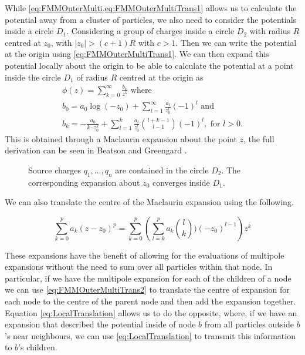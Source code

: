 While \cref{eq:FMMOuterMulti,eq:FMMOuterMultiTrans1} allows us to calculate the potential away from a cluster of particles, we also need to consider the potentials inside a circle $D_1$. Considering a group of charges inside a circle $D_2$ with radius $R$ centred at $z_0$, with $|z_0|>(c+1)R$ with $c>1$. Then we can write the potential at the origin using \cref{eq:FMMOuterMultiTrans1}. We can then expand this potential locally about the origin to be able to calculate the potential at a point inside the circle $D_1$ of radius $R$ centred at the origin as
\begin{equation}
\label{eq:FMMInner}
\begin{gathered}
    \phi(z) = \sum_{k=0}^\infty \frac{b_k}{z^k} \text{ where } \\
    b_0 = a_0\log(-z_0) + \sum_{l=1}^\infty \frac{a_l}{z_0^l}(-1)^l \text{ and } \\
    b_k = -\frac{a_0}{k\cdot z_0^k} + \sum_{l=1}^{k} \frac{a_l}{z_0^{l}} \binom{l+k-1}{l-1}(-1)^l, \text{ for } l>0.
\end{gathered}
\end{equation}
This is obtained through a Maclaurin expansion about the point $z$, the full derivation can be seen in Beatson and Greengard \cite{Beatson}. 

\begin{figure}
    \centering
        \resizebox{.6\linewidth}{!}{}
    \caption{Source charges $q_1,\dots,q_n$ are contained in the circle $D_2$. The corresponding expansion about $z_0$ converges inside $D_1$.}
    \label{fig:Translation}
\end{figure}

We can also translate the centre of the Maclaurin expansion using the following.

\begin{equation}
    \label{eq:LocalTranslation}
    \sum_{k=0}^p a_k(z-z_0)^p = \sum_{k=0}^{p} \left( \sum_{l=k}^p a_k \binom{l}{k})(-z_0)^{l-1} \right)z^k
\end{equation}

These expansions have the benefit of allowing for the evaluations of multipole expansions without the need to sum over all particles within that node. In particular, if we have the multipole expansion for each of the children of a node we can use \cref{eq:FMMOuterMultiTrans2} to translate the centre of expansion for each node to the centre of the parent node and then add the expansion together. Equation \ref{eq:LocalTranslation} allows us to do the opposite, where, if we have an expansion that described the potential inside of node $b$ from all particles outside $b$'s near neighbours, we can use \cref{eq:LocalTranslation} to transmit this information to $b$'s children.

